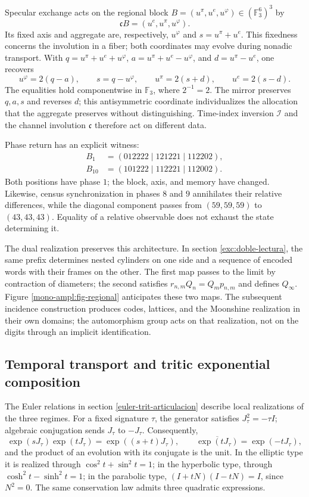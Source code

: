 Specular exchange acts on the regional block
\(B=(u^\pi,u^e,u^\varphi)\in(\mathbb F_3^6)^3\) by
\[
 \mathfrak cB=(u^e,u^\pi,u^\varphi).
\]
Its fixed axis and aggregate are, respectively, \(u^\varphi\) and
\(s=u^\pi+u^e\). This fixedness concerns the involution in a fiber;
both coordinates may evolve during nonadic transport.
With \(q=u^\pi+u^e+u^\varphi\),
\(a=u^\pi+u^e-u^\varphi\), and \(d=u^\pi-u^e\), one recovers
\[
 u^\varphi=2(q-a),\qquad s=q-u^\varphi,\qquad
 u^\pi=2(s+d),\qquad u^e=2(s-d).
\]
The equalities hold componentwise in \(\mathbb F_3\), where
\(2^{-1}=2\). The mirror preserves \(q,a,s\) and reverses \(d\); this
antisymmetric coordinate individualizes the allocation that the aggregate preserves
without distinguishing. Time-index inversion \(\mathcal I\) and the
channel involution \(\mathfrak c\) therefore act on
different data.

Phase return has an explicit witness:
\[
 \begin{aligned}
 B_1&=(012222\mid121221\mid112202),\\
 B_{10}&=(101222\mid112221\mid112002).
 \end{aligned}
\]
Both positions have phase \(1\); the block, axis, and memory have
changed. Likewise, census synchronization in phases \(8\) and
\(9\) annihilates their relative differences, while the diagonal component
passes from \((59,59,59)\) to \((43,43,43)\). Equality of a relative
observable does not exhaust the state determining it.

The dual realization preserves this architecture. In section
\ref{exc:doble-lectura}, the same prefix determines nested
cylinders on one side and a sequence of encoded words with their frames on the other.
The first map passes to the limit by contraction of diameters; the second
satisfies \(r_{n,m}Q_n=Q_mp_{n,m}\) and defines \(Q_\infty\).
Figure \ref{mono-ampl:fig-regional} anticipates these two maps.
The subsequent incidence construction produces codes, lattices, and the
Moonshine realization in their own domains; the automorphism group
acts on that realization, not on the digits through an implicit
identification.



\subsection{Temporal transport and tritic exponential composition}
\label{mono-ampl:euler}

The Euler relations in section \ref{euler-trit-articulacion}
describe local realizations of the three regimes. For a fixed
signature \(\tau\), the generator satisfies \(J_\tau^2=-\tau I\); algebraic
conjugation sends \(J_\tau\) to \(-J_\tau\). Consequently,
\[
 \exp(sJ_\tau)\exp(tJ_\tau)=\exp((s+t)J_\tau),\qquad
 \overline{\exp(tJ_\tau)}=\exp(-tJ_\tau),
\]
and the product of an evolution with its conjugate is the unit. In the elliptic
type it is realized through \(\cos^2t+\sin^2t=1\); in the hyperbolic type,
through \(\cosh^2t-\sinh^2t=1\); in the parabolic type,
\((I+tN)(I-tN)=I\), since \(N^2=0\). The same conservation law
admits three quadratic expressions.

